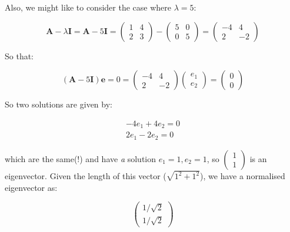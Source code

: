 \documentclass{article}
\begin{document}
\begin{enumerate}
\begin{itemize}
Also, we might like to consider the case where $\lambda=5$:

\begin{displaymath}
\boldsymbol{A} - \lambda \boldsymbol{I} = \boldsymbol{A}-5\boldsymbol{I} = 
  \left( \begin{array}{rr} 1 & 4 \\ 2 & 3 \end{array} \right) - 
  \left( \begin{array}{rr} 5 & 0 \\ 0 & 5 \end{array} \right) = 
  \left( \begin{array}{rr} -4 & 4 \\ 2 & -2 \end{array} \right)
\end{displaymath}

So that:

\begin{displaymath}
(\boldsymbol{A} - 5 \boldsymbol{I}) \boldsymbol{e} = 0 =
  \left( \begin{array}{rr} -4 & 4 \\ 2 & -2 \end{array} \right)
  \left( \begin{array}{r} e_{1} \\ e_{2} \end{array} \right) =
  \left( \begin{array}{r} 0 \\ 0 \end{array} \right)
\end{displaymath}

So two solutions are given by:

\begin{eqnarray*}
-4 e_{1} + 4 e_{2} = 0\\
2 e_{1} - 2 e_{2} = 0
\end{eqnarray*}

which are the same(!) and have \emph{a} solution $e_{1} = 1, e_{2} = 1$, so 
$\left( \begin{array}{r} 1 \\ 1 \end{array} \right)$ is an eigenvector.   Given the length of this vector ($\sqrt{1^{2} + 1^{2}}$), we have a normalised eigenvector as:

\begin{displaymath}
\left( \begin{array}{r} 1/\sqrt{2} \\ 1/\sqrt{2} \end{array} \right)
\end{displaymath}



\end{itemize}
\end{enumerate}
\end{document}
